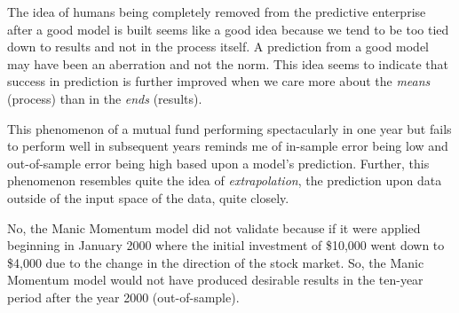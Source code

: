 \documentclass[12pt]{article}
\begin{document}
\begin{enumerate}

\begin{tcolorbox}[colback=white, sharp corners]
The idea of humans being completely removed from the predictive enterprise after a good model is built seems like a good idea because we tend to be too tied down to results and not in the process itself. A prediction from a good model may have been an aberration and not the norm. This idea seems to indicate that success in prediction is further improved when we care more about the \emph{means} (process) than in the \emph{ends} (results). 
\end{tcolorbox}



\begin{tcolorbox}[colback=white, sharp corners]
This phenomenon of a mutual fund performing spectacularly in one year but fails to perform well in subsequent years reminds me of in-sample error being low and out-of-sample error being high based upon a model's prediction. Further, this phenomenon resembles quite the idea of \emph{extrapolation}, the prediction upon data outside of the input space of the data, quite closely. 
\end{tcolorbox}



\begin{tcolorbox}[colback=white, sharp corners]
No, the Manic Momentum model did not validate because if it were applied beginning in January 2000 where the initial investment of \$10,000 went down to \$4,000 due to the change in the direction of the stock market. So, the Manic Momentum model would not have produced desirable results in the ten-year period after the year 2000 (out-of-sample). 
\end{tcolorbox}



\end{enumerate}
\end{document}
